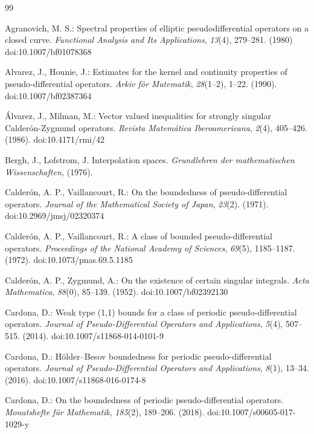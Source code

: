 \documentclass[12pt, reqno]{amsart}
\theoremstyle{definition}
\theoremstyle{remark}
\numberwithin{equation}{section}
\begin{document}

\begin{thebibliography}{99}


Agranovich, M. S.: Spectral properties of elliptic pseudodifferential operators on a closed curve. \textit{Functional Analysis and Its Applications}, \textit{13}(4), 279–281. (1980) doi:10.1007/bf01078368 


Alvarez, J.,  Hounie, J.: Estimates for the kernel and continuity properties of pseudo-differential operators. \textit{Arkiv för Matematik}, \textit{28}(1–2), 1–22. (1990). doi:10.1007/bf02387364 


Álvarez, J.,  Milman, M.: Vector valued inequalities for strongly singular Calderón-Zygmund operators. \textit{Revista Matemática Iberoamericana}, \textit{2}(4), 405–426. (1986). doi:10.4171/rmi/42 

Bergh, J., Lofstrom, J. Interpolation spaces. \textit{Grundlehren der mathematischen Wissenschaften,} (1976).

Calder\'on, A. P.,  Vaillancourt, R.: On the boundedness of pseudo-differential operators. \textit{Journal of the Mathematical Society of Japan}, \textit{23}(2). (1971). doi:10.2969/jmsj/02320374 


Calder\'on, A. P.,  Vaillancourt, R.: A class of bounded pseudo-differential operators. \textit{Proceedings of the National Academy of Sciences}, \textit{69}(5), 1185–1187. (1972). doi:10.1073/pnas.69.5.1185 


Calder\'on, A. P.,  Zygmund, A.: On the existence of certain singular integrals. \textit{Acta Mathematica}, \textit{88}(0), 85–139. (1952). doi:10.1007/bf02392130 


Cardona, D.: Weak type (1,1) bounds for a class of periodic pseudo-differential operators. \textit{Journal of Pseudo-Differential Operators and Applications}, \textit{5}(4), 507–515. (2014). doi:10.1007/s11868-014-0101-9 


Cardona, D.: Hölder–Besov boundedness for periodic pseudo-differential operators. \textit{Journal of Pseudo-Differential Operators and Applications}, \textit{8}(1), 13–34. (2016). doi:10.1007/s11868-016-0174-8 


Cardona, D.: On the boundedness of periodic pseudo-differential operators. \textit{Monatshefte für Mathematik}, \textit{185}(2), 189–206. (2018). doi:10.1007/s00605-017-1029-y 



\end{thebibliography}
\end{document}
